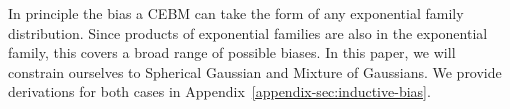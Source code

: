 \documentclass[tablecaption=bottom,wcp]{jmlr} %
\begin{document}



In principle the bias a CEBM can take the form of any exponential family distribution. Since products of exponential families are also in the exponential family, this covers a broad range of possible biases. In this paper, we will constrain ourselves to Spherical Gaussian and Mixture of Gaussians. We provide derivations for both cases in Appendix~\ref{appendix-sec:inductive-bias}.




\end{document}
